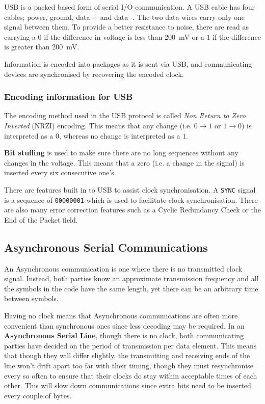 USB is a packed based form of serial I/O communication. A USB cable has four
cables; power, ground, data + and data -. The two data wires carry only one
signal between them. To provide a better resistance to noise, there are read as
carrying a $0$ if the difference in voltage is less than \SI{200}{\milli\volt}
or a $1$ if the difference is greater than \SI{200}{\milli\volt}.

Information is encoded into packages as it is sent via USB, and communicating
devices are synchronised by recovering the encoded clock.

\subsubsection{Encoding information for USB}

The encoding method used in the USB protocol is called {\it Non Return to Zero
Inverted} (NRZI) encoding. This means that any change (i.e. $0 \rightarrow 1$ or
$1 \rightarrow 0$) is interpreted as a $0$, whereas no change is interpreted as
a $1$.

{\bf Bit stuffing} is used to make sure there are no long sequences without any
changes in the voltage. This means that a zero (i.e. a change in the signal)
is inserted every six consecutive one's.

There are features built in to USB to assist clock synchronisation. A {\tt SYNC}
signal is a sequence of {\tt 00000001} which is used to facilitate clock
synchronisation. There are also many error correction features such as a Cyclic
Redundancy Check or the End of the Packet field.

\subsection{Asynchronous Serial Communications}

An Asynchronous communication is one where there is no transmitted clock signal.
Instead, both parties know an approximate transmission frequency and all the
symbols in the code have the same length, yet there can be an arbitrary time
between symbols.

Having no clock means that Asynchronous communications are often more convenient
than synchronous ones since less decoding may be required. In an {\bf
Asynchronous Serial Line}, though there is no clock, both communicating parties
have decided on the period of transmission per data element. This means that
though they will differ slightly, the transmitting and receiving ends of the
line won't drift apart too far with their timing, though they must resynchronise
every so often to ensure that their clocks do stay within acceptable times of
each other. This will slow down communications since extra bits need to be
inserted every couple of bytes.

